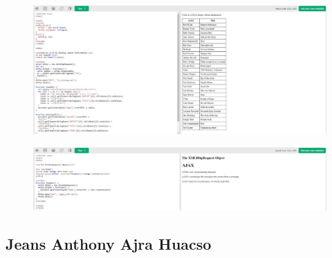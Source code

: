 \documentclass{article}
\begin{document}
\begin{itemize}
\begin{figure}[H]
		\end{figure}
		\begin{figure}[H]
			\centering
			\includegraphics[width=1.0\textwidth,keepaspectratio]{img/w21.jpg}
		\end{figure}
		\begin{figure}[H]
			\centering
			\includegraphics[width=1.0\textwidth,keepaspectratio]{img/w22.jpg}
		\end{figure}
	\end{itemize}
	\subsection{Jeans Anthony Ajra Huacso}
\end{document}
